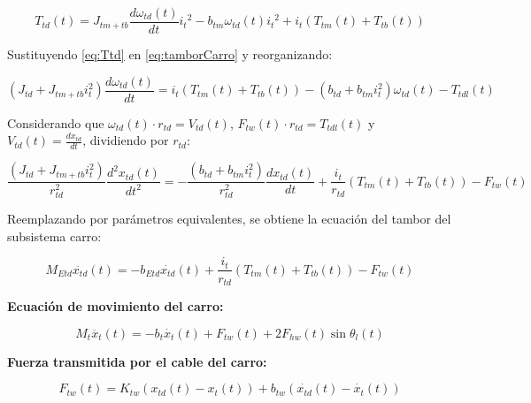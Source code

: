 \documentclass{article}
\begin{document}
            \begin{equation} \label{eq:Ttd}
                T_{td}(t) = J_{tm+tb} \frac{d \omega_{td}(t)}{dt} {i_t}^2 - b_{tm} \omega_{td}(t) {i_t}^2 + i_t (T_{tm}(t) + T_{tb}(t))
            \end{equation}
            
            Sustituyendo \ref{eq:Ttd} en \ref{eq:tamborCarro} y reorganizando:
            
            \begin{equation} \label{eq:carroTtdl}
                (J_{td} + J_{tm+tb} i_t^2) \frac{d \omega_{td}(t)}{dt} = i_t (T_{tm}(t) + T_{tb}(t)) - (b_{td} + b_{tm} i_t^2) \omega_{td}(t) - T_{tdl}(t)
            \end{equation}
            
            Considerando que $\omega_{td}(t) \cdot r_{td} = V_{td}(t)$, $F_{tw}(t) \cdot r_{td} = T_{tdl}(t)$ y $V_{td}(t) = \frac{d x_{td}}{dt}$, dividiendo por $r_{td}$:
            
            \begin{equation} \label{eq:carroFtw}
                \frac{(J_{td} + J_{tm+tb} i_t^2)}{r_{td}^2} \frac{d^2 x_{td}(t)}{dt^2} = - \frac{(b_{td} + b_{tm} i_t^2)}{r_{td}^2} \frac{d x_{td}(t)}{dt} + \frac{i_t}{r_{td}} (T_{tm}(t) + T_{tb}(t)) - F_{tw}(t)
            \end{equation}
            
            Reemplazando por parámetros equivalentes, se obtiene la ecuación del tambor del subsistema carro:
            
            \begin{equation} \label{eq:TamborCarro}
                M_{Etd} \ddot{x_{td}}(t) = - b_{Etd} \dot{x_{td}}(t) + \frac{i_t}{r_{td}} (T_{tm}(t) + T_{tb}(t)) - F_{tw}(t)
            \end{equation}
            
            \textbf{Ecuación de movimiento del carro:}
            
            \begin{equation} \label{eq:Carro}
                M_t \ddot{x_{t}}(t) = - b_t \dot{x_{t}}(t) + F_{tw}(t) + 2 F_{hw}(t) \sin{\theta_l(t)}
            \end{equation}
            
            \textbf{Fuerza transmitida por el cable del carro:}
            
            \begin{equation} \label{eq:fuerzaCableCarro}
                F_{tw}(t) = K_{tw}(x_{td}(t) - x_t(t)) + b_{tw}(\dot{x_{td}}(t) - \dot{x_t}(t))
            \end{equation}
            
\end{document}

